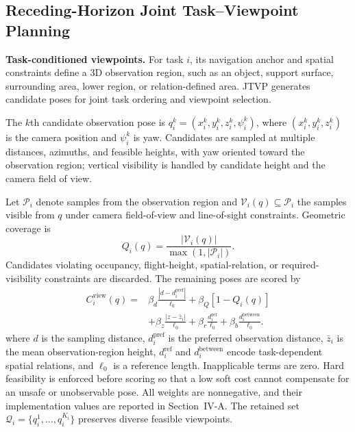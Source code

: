 \documentclass[letterpaper,10pt,conference]{ieeeconf}
\begin{document}
\subsection{Receding-Horizon Joint Task--Viewpoint Planning}
\label{sec:jtvp}

\textbf{Task-conditioned viewpoints.} For task $i$, its navigation anchor and spatial constraints define a 3D observation region, such as an object, support surface, surrounding area, lower region, or relation-defined area. JTVP generates candidate poses for joint task ordering and viewpoint selection.

The $k$th candidate observation pose is $q_i^k=(x_i^k,y_i^k,z_i^k,\psi_i^k)$, where $(x_i^k,y_i^k,z_i^k)$ is the camera position and $\psi_i^k$ is yaw. Candidates are sampled at multiple distances, azimuths, and feasible heights, with yaw oriented toward the observation region; vertical visibility is handled by candidate height and the camera field of view.

Let $\mathcal P_i$ denote samples from the observation region and $\mathcal V_i(q)\subseteq\mathcal P_i$ the samples visible from $q$ under camera field-of-view and line-of-sight constraints. Geometric coverage is
\begin{equation}
Q_i(q)=\frac{|\mathcal V_i(q)|}{\max(1,|\mathcal P_i|)}.
\end{equation}
Candidates violating occupancy, flight-height, spatial-relation, or required-visibility constraints are discarded. The remaining poses are scored by
\begin{equation}
\begin{aligned}
C_i^{\mathrm{view}}(q)={}&
\beta_d\frac{|d-d_i^{\mathrm{pref}}|}{\ell_0}
+\beta_Q[1-Q_i(q)]\\
&+\beta_z\frac{|z-\bar z_i|}{\ell_0}
+\beta_r\frac{d_i^{\mathrm{ref}}}{\ell_0}
+\beta_b\frac{d_i^{\mathrm{between}}}{\ell_0}.
\end{aligned}
\label{eq:view-cost}
\end{equation}
where $d$ is the sampling distance, $d_i^{\mathrm{pref}}$ is the preferred observation distance, $\bar z_i$ is the mean observation-region height, $d_i^{\mathrm{ref}}$ and $d_i^{\mathrm{between}}$ encode task-dependent spatial relations, and $\ell_0$ is a reference length. Inapplicable terms are zero. Hard feasibility is enforced before scoring so that a low soft cost cannot compensate for an unsafe or unobservable pose. All weights are nonnegative, and their implementation values are reported in Section~IV-A. The retained set $\mathcal Q_i=\{q_i^1,\ldots,q_i^{K_i}\}$ preserves diverse feasible viewpoints.
\end{document}
